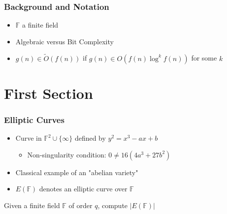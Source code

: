 \documentclass{beamer}
\newcommand{\ot}{\widetilde{O}}
\begin{document}
\begin{frame}
\frametitle{Background and Notation}

\begin{itemize}

\item $\mathbb{F}$ a finite field
\item Algebraic versus Bit Complexity
\item $g(n) \in \ot(f(n))$ if $g(n) \in O(f(n) \log^k f(n))$ for some $k$

  
  
  
  
\end{itemize}

\end{frame}


\section{First Section} %



\begin{frame}
\frametitle{Elliptic Curves}
\begin{itemize}
\item Curve in $\mathbb{F}^2 \cup \{ \infty \}$ defined by $y^2 = x^3 -ax + b$
\begin{itemize}
    \item Non-singularity condition: $0 \neq 16(4a^3 + 27b^2)$
\end{itemize}

\item Classical example of an "abelian variety"

\item $E(\mathbb{F})$ denotes an elliptic curve over $\mathbb{F}$

\end{itemize}

\begin{problem}
Given a finite field $\mathbb{F}$ of order $q$, compute $|E(\mathbb{F})|$
\end{problem}

\end{frame}
\end{document}

